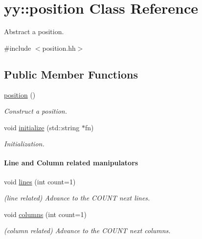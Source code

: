 \hypertarget{classyy_1_1position}{
\section{yy::position Class Reference}
\label{classyy_1_1position}
}


Abstract a position.  




{\ttfamily \#include $<$position.hh$>$}

\subsection*{Public Member Functions}
\begin{DoxyCompactItemize}
\item 
\hyperlink{classyy_1_1position_aec00f03050f84ddfd81364bab553ccae}{position} ()
\begin{DoxyCompactList}\small\item\em Construct a position. \end{DoxyCompactList}\item 
void \hyperlink{classyy_1_1position_a0d691a4ae06dec37cf983d813745394d}{initialize} (std::string $\ast$fn)
\begin{DoxyCompactList}\small\item\em Initialization. \end{DoxyCompactList}\end{DoxyCompactItemize}
\begin{Indent}\paragraph*{Line and Column related manipulators}
\begin{DoxyCompactItemize}
\item 
void \hyperlink{classyy_1_1position_a4fbdd03b4e09fa8755d79d3e675d6d3a}{lines} (int count=1)
\begin{DoxyCompactList}\small\item\em (line related) Advance to the COUNT next lines. \end{DoxyCompactList}\item 
void \hyperlink{classyy_1_1position_ab15e0388c4fd433aa19c2435e49f72e9}{columns} (int count=1)
\begin{DoxyCompactList}\small\item\em (column related) Advance to the COUNT next columns. \end{DoxyCompactList}\end{DoxyCompactItemize}
\end{Indent}
